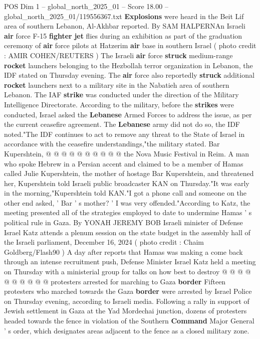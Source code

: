 \begin{textsample}{POS Dim 1 – global\_north\_2025\_01 – Score 18.00 – global\_north\_2025\_01/119556367.txt}  \label{ex:f1_pos_393}
\textbf{Explosions} were heard in the Beit Lif area of southern Lebanon, Al-Akhbar reported.
By SAM HALPERNAn Israeli \textbf{air} force F-15 \textbf{fighter} \textbf{jet} flies during an exhibition as part of the graduation ceremony of \textbf{air} force pilots at Hatzerim \textbf{air} base in southern Israel ( photo credit : AMIR COHEN/REUTERS ) The Israeli \textbf{air} force \textbf{struck} medium-range \textbf{rocket} launchers belonging to the Hezbollah terror organization in Lebanon, the IDF stated on Thursday evening.
The \textbf{air} force also reportedly \textbf{struck} additional \textbf{rocket} launchers next to a military site in the Nabatieh area of southern Lebanon.
The IAF \textbf{strike} was conducted under the direction of the Military Intelligence Directorate.
According to the military, before the \textbf{strikes} were conducted, Israel asked the \textbf{Lebanese} Armed Forces to address the issue, as per the current ceasefire agreement.
The \textbf{Lebanese} army did not do so, the IDF noted."The IDF continues to act to remove any threat to the State of Israel in accordance with the ceasefire understandings,"the military stated.
Bar Kupershtein, @ @ @ @ @ @ @ @ @ @ the Nova Music Festival in Reim.
A man who spoke Hebrew in a Persian accent and claimed to be a member of Hamas called Julie Kupershtein, the mother of hostage Bar Kupershtein, and threatened her, Kupershtein told Israeli public broadcaster KAN on Thursday."It was early in the morning,"Kupershtein told KAN."I got a phone call and someone on the other end asked, ' Bar ' s mother? ' I was very offended."According to Katz, the meeting presented all of the strategies employed to date to undermine Hamas ' s political rule in Gaza.
By YONAH JEREMY BOB Israeli minister of Defense Israel Katz attends a plenum session on the state budget in the assembly hall of the Israeli parliament, December 16, 2024 ( photo credit : Chaim Goldberg/Flash90 ) A day after reports that Hamas was making a come back through an intense recruitment push, Defense Minister Israel Katz held a meeting on Thursday with a ministerial group for talks on how best to destroy @ @ @ @ @ @ @ @ @ @ protesters arrested for marching to Gaza \textbf{border} Fifteen protesters who marched towards the Gaza \textbf{border} were arrested by Israel Police on Thursday evening, according to Israeli media.
Following a rally in support of Jewish settlement in Gaza at the Yad Mordechai junction, dozens of protesters headed towards the fence in violation of the Southern \textbf{Command} Major General ' s order, which designates areas adjacent to the fence as a closed military zone.

\end{textsample}
